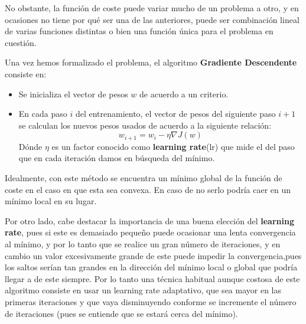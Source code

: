             \medskip

            \noindent No obstante, la función de coste puede variar mucho de un problema a otro, y en ocasiones no tiene por qué ser una de las anteriores, puede ser combinación lineal de varias funciones distintas o bien una función única para el problema en cuestión.

            \medskip

            \noindent Una vez hemos formalizado el problema, el algoritmo \textbf{Gradiente Descendente} consiste en: 
    
            \begin{itemize}
                \item Se inicializa el vector de pesos $w$ de acuerdo a un criterio.
                \item En cada paso $i$ del entrenamiento, el vector de pesos del siguiente paso $i+1$ se calculan los nuevos pesos usados de acuerdo a la siguiente relación: 
                \begin{equation}
                    w_{i+1}=w_i-\eta \nabla J(w)
                \end{equation}
                \noindent Dónde $\eta$ es un factor conocido como \textbf{learning rate}(lr) que mide el  del paso que en cada iteración damos en búsqueda del mínimo. 
            \end{itemize}
    
            \noindent Idealmente, con este método se encuentra un mínimo global de la función de coste en el caso en que esta sea convexa. En caso de no serlo podría caer en un mínimo local en su lugar. 
    
            \medskip
    
            \noindent Por otro lado, cabe destacar la importancia de una buena elección del \textbf{learning rate}, pues si este es demasiado pequeño puede ocasionar una lenta convergencia al mínimo, y por lo tanto que se realice un gran número de iteraciones, y en cambio un valor excesivamente grande de este puede impedir la convergencia,pues los saltos serían tan grandes en la dirección del mínimo local o global que podría llegar a  de este siempre. Por lo tanto una técnica habitual aunque costosa de este algoritmo consiste en usar un learning rate adaptativo, que sea mayor en las primeras iteraciones y que vaya disminuyendo conforme se incremente el número de iteraciones (pues se entiende que se estará cerca del mínimo).
    
